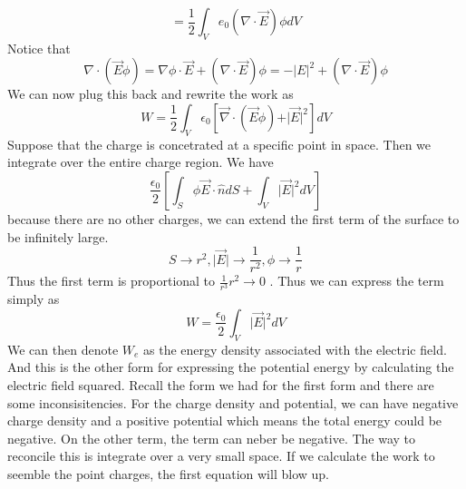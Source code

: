 \begin{remark}
    \[
        = \frac{1}{2} \int _V e_0 (\nabla \cdot \vec{E} ) \phi dV
    \]
    Notice that 
    \[
    \nabla \cdot (\vec{E}  \phi ) = \nabla \phi  \cdot \vec{E}  + (\nabla  \cdot \vec{E} ) \phi = -\vert E \vert ^{2} + (\nabla  \cdot \vec{E} ) \phi 
    \]
    We can now plug this back and rewrite the work as 
    \[
        W= \frac{1}{2} \int _V \epsilon _0 \left[ \vec{\nabla}  \cdot (\vec{E}  \phi ) + \vert \vec{E}  \vert  ^{2} \right] dV
    \]
    Suppose that the charge is concetrated at a specific point in space. Then we integrate over the entire charge region. We have 
    \[
        \frac{\epsilon_0}{2} \left[  \int _S \phi  \vec{E}  \cdot \hat{n}  dS + \int _V \vert  \vec{E}  \vert  ^{2}  dV\right] 
    \]
    because there are no other charges, we can extend the first term of the surface to be infinitely large. 
    \[
        S \to  r^{2} , \vert  \vec{E}  \vert \to  \frac{1}{r^{2} }, \phi \to \frac{1}{r}
    \]
    Thus the first term is proportional to \(\frac{1}{r^{3} } r^{2}  \to  0\) . Thus we can express the term simply as 
    \[
        W = \frac{\epsilon_0}{2} \int _V \vert \vec{E}  \vert ^{2}  dV
    \]
    We can then denote \(W_e\) as the energy density associated with the electric field. And this is the other form for expressing the potential energy 
    by calculating the electric field squared. Recall the form we had for the first form and there are some inconsisitencies. For the charge density and potential, we can have 
    negative charge density and a positive potential which means the total energy could be negative. On the other term, the term can neber be negative. The 
    way to reconcile this is integrate over a very small space. If we calculate the work to seemble the point charges, the first equation will blow up. 
\end{remark} 